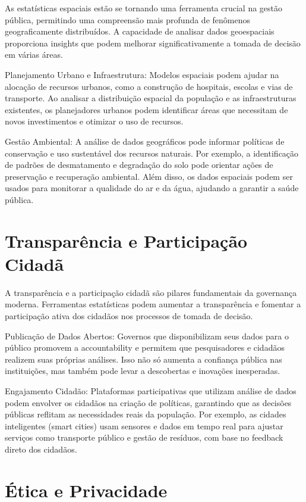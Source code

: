 As estatísticas espaciais estão se tornando uma ferramenta crucial na gestão pública, permitindo uma compreensão mais profunda de fenômenos geograficamente distribuídos. A capacidade de analisar dados geoespaciais proporciona insights que podem melhorar significativamente a tomada de decisão em várias áreas.\vskip0.3cm

Planejamento Urbano e Infraestrutura: Modelos espaciais podem ajudar na alocação de recursos urbanos, como a construção de hospitais, escolas e vias de transporte. Ao analisar a distribuição espacial da população e as infraestruturas existentes, os planejadores urbanos podem identificar áreas que necessitam de novos investimentos e otimizar o uso de recursos.\vskip0.3cm

Gestão Ambiental: A análise de dados geográficos pode informar políticas de conservação e uso sustentável dos recursos naturais. Por exemplo, a identificação de padrões de desmatamento e degradação do solo pode orientar ações de preservação e recuperação ambiental. Além disso, os dados espaciais podem ser usados para monitorar a qualidade do ar e da água, ajudando a garantir a saúde pública.

\section{Transparência e Participação Cidadã}

A transparência e a participação cidadã são pilares fundamentais da governança moderna. Ferramentas estatísticas podem aumentar a transparência e fomentar a participação ativa dos cidadãos nos processos de tomada de decisão.\vskip0.3cm

Publicação de Dados Abertos: Governos que disponibilizam seus dados para o público promovem a accountability e permitem que pesquisadores e cidadãos realizem suas próprias análises. Isso não só aumenta a confiança pública nas instituições, mas também pode levar a descobertas e inovações inesperadas.\vskip0.3cm

Engajamento Cidadão: Plataformas participativas que utilizam análise de dados podem envolver os cidadãos na criação de políticas, garantindo que as decisões públicas reflitam as necessidades reais da população. Por exemplo, as cidades inteligentes (smart cities) usam sensores e dados em tempo real para ajustar serviços como transporte público e gestão de resíduos, com base no feedback direto dos cidadãos.


\newpage
\section{Ética e Privacidade}

